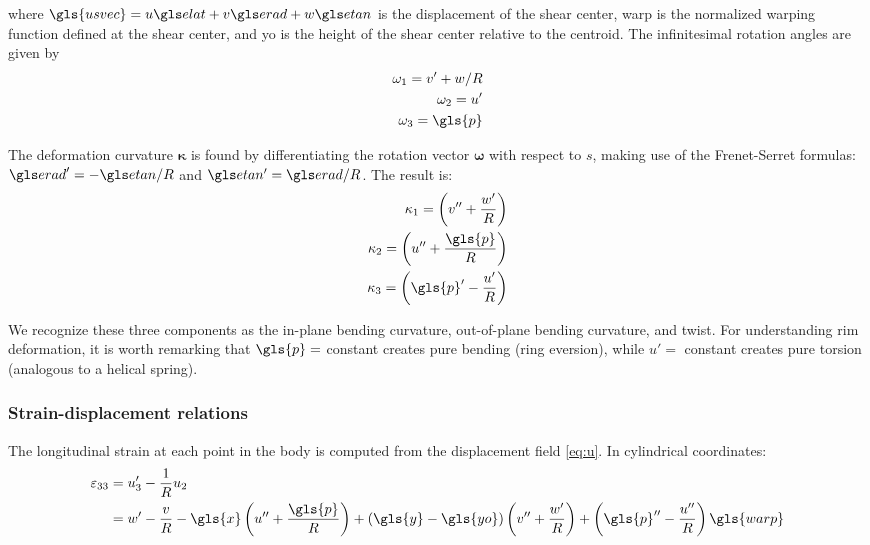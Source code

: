 \documentclass[\rootdir/thesis.tex]{subfiles}
\begin{document}
where $\gls{usvec} = u\eo + v\et + w\eh$ is the displacement of the shear center, \gls{warp} is the normalized warping function defined at the shear center, and \gls{yo} is the height of the shear center relative to the centroid. The infinitesimal rotation angles are given by
\begin{subequations}
\label{eq:omega}
\begin{align}
\omega_1 = v' + w/R\\
\omega_2 = u'\\
\omega_3 = \gls{p}
\end{align}
\end{subequations}

The deformation curvature $\mathbf{\kappa}$ is found by differentiating the rotation vector $\mathbf{\omega}$ with respect to $s$, making use of the Frenet-Serret formulas: $\et' = -\eh/R$ and $\eh' = \et/R$. The result is:
\begin{subequations}
\label{eq:kappa}
\begin{align}
\kappa_1 = \left( v'' + \frac{w'}{R} \right) \label{eq:kappa1}\\
\kappa_2 = \left( u'' + \frac{\gls{p}}{R} \right) \label{eq:kappa2}\\
\kappa_3 = \left( \gls{p}' - \frac{u'}{R} \right) \label{eq:kappa3}
\end{align}
\end{subequations}

We recognize these three components as the in-plane bending curvature, out-of-plane bending curvature, and twist. For understanding rim deformation, it is worth remarking that $\gls{p}=$ constant creates pure bending (ring eversion), while $u'=$ constant creates pure torsion (analogous to a helical spring).

\subsubsection{Strain-displacement relations}

The longitudinal strain at each point in the body is computed from the displacement field \eqref{eq:u}. In cylindrical coordinates:
\begin{align}
\label{eq:strain}
\begin{split}
\varepsilon_{33} &= u_3' - \frac{1}{R} u_2\\
                 &= w' - \frac{v}{R} - \gls{x}\left(u'' + \frac{\gls{p}}{R}\right) +
                 	(\gls{y}-\gls{yo})\left(v'' + \frac{w'}{R}\right) +
                 	\left(\gls{p}'' - \frac{u''}{R}\right)\gls{warp}
\end{split}
\end{align}
\end{document}
